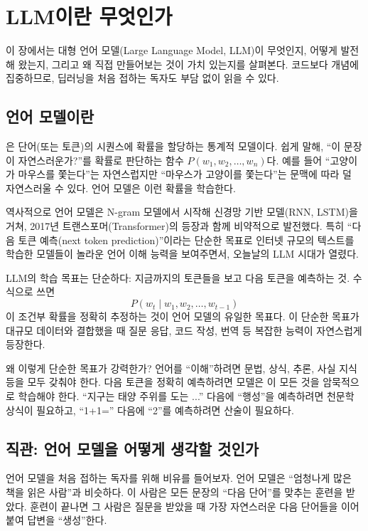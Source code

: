 \chapter{LLM이란 무엇인가}
\label{ch:intro}

이 장에서는 대형 언어 모델(Large Language Model, LLM)이 무엇인지, 어떻게 발전해 왔는지, 그리고 왜 직접 만들어보는 것이 가치 있는지를 살펴본다. 코드보다 개념에 집중하므로, 딥러닝을 처음 접하는 독자도 부담 없이 읽을 수 있다.

\section{언어 모델이란}

은 단어(또는 토큰)의 시퀀스에 확률을 할당하는 통계적 모델이다. 쉽게 말해, ``이 문장이 자연스러운가?''를 확률로 판단하는 함수 $P(w_1, w_2, \dots, w_n)$다. 예를 들어 ``고양이가 마우스를 쫓는다''는 자연스럽지만 ``마우스가 고양이를 쫓는다''는 문맥에 따라 덜 자연스러울 수 있다. 언어 모델은 이런 확률을 학습한다.

역사적으로 언어 모델은 N-gram 모델에서 시작해 신경망 기반 모델(RNN, LSTM)을 거쳐, 2017년 트랜스포머(Transformer)의 등장과 함께 비약적으로 발전했다. 특히 ``다음 토큰 예측(next token prediction)''이라는 단순한 목표로 인터넷 규모의 텍스트를 학습한 모델들이 놀라운 언어 이해 능력을 보여주면서, 오늘날의 LLM 시대가 열렸다.

\begin{infobox}[다음 토큰 예측]
LLM의 학습 목표는 단순하다: 지금까지의 토큰들을 보고 다음 토큰을 예측하는 것. 수식으로 쓰면
\[
P(w_t \mid w_1, w_2, \dots, w_{t-1})
\]
이 조건부 확률을 정확히 추정하는 것이 언어 모델의 유일한 목표다. 이 단순한 목표가 대규모 데이터와 결합했을 때 질문 응답, 코드 작성, 번역 등 복잡한 능력이 자연스럽게 등장한다.

왜 이렇게 단순한 목표가 강력한가? 언어를 ``이해''하려면 문법, 상식, 추론, 사실 지식 등을 모두 갖춰야 한다. 다음 토큰을 정확히 예측하려면 모델은 이 모든 것을 암묵적으로 학습해야 한다. ``지구는 태양 주위를 도는 ...'' 다음에 ``행성''을 예측하려면 천문학 상식이 필요하고, ``1+1='' 다음에 ``2''를 예측하려면 산술이 필요하다.
\end{infobox}

\section{직관: 언어 모델을 어떻게 생각할 것인가}

언어 모델을 처음 접하는 독자를 위해 비유를 들어보자. 언어 모델은 ``엄청나게 많은 책을 읽은 사람''과 비슷하다. 이 사람은 모든 문장의 ``다음 단어''를 맞추는 훈련을 받았다. 훈련이 끝나면 그 사람은 질문을 받았을 때 가장 자연스러운 다음 단어들을 이어붙여 답변을 ``생성''한다.

